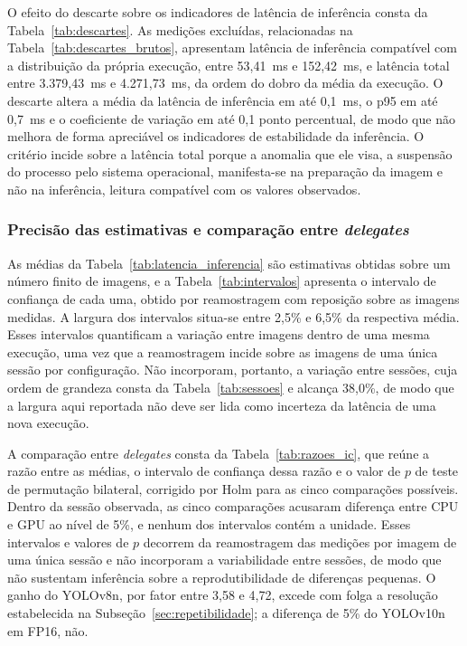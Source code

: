 \documentclass[artigo,times,capa]{iftex2024}
\begin{document}
O efeito do descarte sobre os indicadores de latência de inferência consta da Tabela~\ref{tab:descartes}. As medições excluídas, relacionadas na Tabela~\ref{tab:descartes_brutos}, apresentam latência de inferência compatível com a distribuição da própria execução, entre 53,41~ms e 152,42~ms, e latência total entre 3.379,43~ms e 4.271,73~ms, da ordem do dobro da média da execução. O descarte altera a média da latência de inferência em até 0,1~ms, o p95 em até 0,7~ms e o coeficiente de variação em até 0,1 ponto percentual, de modo que não melhora de forma apreciável os indicadores de estabilidade da inferência. O critério incide sobre a latência total porque a anomalia que ele visa, a suspensão do processo pelo sistema operacional, manifesta-se na preparação da imagem e não na inferência, leitura compatível com os valores observados.



\FloatBarrier

\subsubsection{Precisão das estimativas e comparação entre
\textit{delegates}}
\label{sec:incerteza}

As médias da Tabela~\ref{tab:latencia_inferencia} são estimativas obtidas
sobre um número finito de imagens, e a Tabela~\ref{tab:intervalos} apresenta o
intervalo de confiança de cada uma, obtido por reamostragem com reposição sobre as imagens medidas. A largura dos intervalos situa-se entre 2,5\% e 6,5\% da respectiva média. Esses intervalos quantificam a variação entre imagens dentro de uma mesma execução, uma vez que a reamostragem incide sobre as imagens de uma única sessão por configuração. Não incorporam, portanto, a variação entre sessões, cuja ordem de grandeza consta da Tabela~\ref{tab:sessoes} e alcança 38,0\%, de modo que a largura aqui reportada não deve ser lida como incerteza da latência de uma nova execução.



A comparação entre \textit{delegates} consta da
Tabela~\ref{tab:razoes_ic}, que reúne a razão entre as médias, o intervalo de
confiança dessa razão e o valor de $p$ de teste de permutação bilateral,
corrigido por Holm para as cinco comparações possíveis. Dentro da sessão observada, as cinco comparações acusaram diferença entre \ac{CPU} e \ac{GPU} ao nível de 5\%, e nenhum dos intervalos contém a unidade. Esses intervalos e valores de $p$ decorrem da reamostragem das medições por imagem de uma única sessão e não incorporam a variabilidade entre sessões, de modo que não sustentam inferência sobre a reprodutibilidade de diferenças pequenas. O ganho do YOLOv8n, por fator entre 3,58 e 4,72, excede com folga a resolução estabelecida na Subseção~\ref{sec:repetibilidade}; a diferença de 5\% do YOLOv10n em \ac{FP16}, não.
\end{document}
